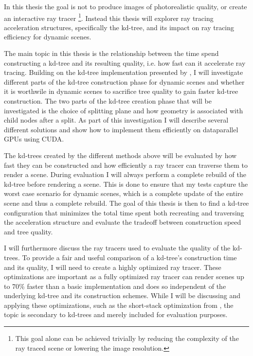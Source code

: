 In this thesis the goal is not to produce images of photorealistic quality, or
create an interactive ray tracer \footnote{This goal alone can be achieved
  trivially by reducing the complexity of the ray traced scene or lowering the
  image resolution.}. Instead this thesis will explorer ray tracing acceleration
structures, specifically the kd-tree, and its impact on ray tracing efficiency
for dynamic scenes.

The main topic in this thesis is the relationship between the time spend
constructing a kd-tree and its resulting quality, i.e. how fast can it
accelerate ray tracing. Building on the kd-tree implementation presented by
\zhou{}, I will investigate different parts of the kd-tree construction phase
for dynamic scenes and whether it is worthwile in dynamic scenes to sacrifice
tree quality to gain faster kd-tree construction. The two parts of the kd-tree
creation phase that will be investigated is the choice of splitting plane and
how geometry is associated with child nodes after a split. As part of this
investigation I will describe several different solutions and show how to
implement them efficiently on dataparallel GPUs using CUDA.

The kd-trees created by the different methods above will be evaluated by how
fast they can be constructed and how efficiently a ray tracer can traverse them
to render a scene. During evaluation I will always perform a complete rebuild of
the kd-tree before rendering a scene. This is done to ensure that my tests
capture the worst case scenario for dynamic scenes, which is a complete update
of the entire scene and thus a complete rebuild. The goal of this thesis is then
to find a kd-tree configuration that minimizes the total time spent both
recreating and traversing the acceleration structure and evaluate the tradeoff
between construction speed and tree quality.

I will furthermore discuss the ray tracers used to evaluate the quality of the
kd-trees. To provide a fair and useful comparison of a kd-tree's construction
time and its quality, I will need to create a highly optimized ray tracer. These
optimizations are important as a fully optimized ray tracer can render scenes up
to 70\% faster than a basic implementation and does so independent of the
underlying kd-tree and its construction schemes. While I will be discussing and
applying these optimizations, such as the short-stack optimization from \horn{},
the topic is secondary to kd-trees and merely included for evaluation purposes.

